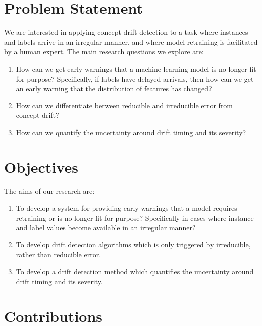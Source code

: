 \section{Problem Statement}

We are interested in applying concept drift detection to a task where instances and labels arrive in an irregular manner, and where model retraining is facilitated by a human expert. The main research questions we explore are:
\begin{enumerate}
  \item How can we get early warnings that a machine learning model is no longer fit for purpose? Specifically, if labels have delayed arrivals, then how can we get an early warning that the distribution of features has changed?
  \item How can we differentiate between reducible and irreducible error from concept drift?
  \item How can we quantify the uncertainty around drift timing and its severity?
\end{enumerate}

\section{Objectives}

The aims of our research are:
\begin{enumerate}
  \item To develop a system for providing early warnings that a model requires retraining or is no longer fit for purpose? Specifically in cases where instance and label values become available in an irregular manner?
  \item To develop drift detection algorithms which is only triggered by irreducible, rather than reducible error.
  \item To develop a drift detection method which quantifies the uncertainty around drift timing and its severity.
\end{enumerate}

\section{Contributions}

